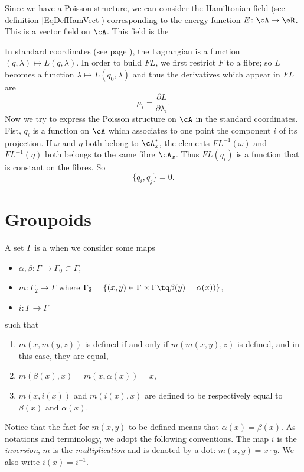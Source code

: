 Since we have a Poisson structure, we can consider the Hamiltonian field (see definition \eqref{EqDefHamVect}) corresponding to the energy function $E\colon \cA\to \eR$. This is a vector field on $\cA$. This field is the 

In standard coordinates (see page \pageref{PgStandCoord}), the Lagrangian is a function $(q,\lambda)\mapsto L(q,\lambda)$. In order to build $FL$, we first restrict $F$ to a fibre; so $L$ becomes a function $\lambda\mapsto L(q_{0},\lambda)$ and thus the derivatives which appear in $FL$ are
\[
	\mu_{i}=\frac{ \partial L }{ \partial\lambda_{i} }.
\]
Now we try to express the Poisson structure on $\cA$ in the standard coordinates. Fist, $q_{i}$ is a  function on $\cA$ which associates to one point the component $i$ of its projection. If $\omega$ and $\eta$ both belong to $\cA^*_{x}$, the elements $FL^{-1}(\omega)$ and $FL^{-1}(\eta)$ both belongs to the same fibre $\cA_{x}$. Thus $FL(q_{i})$ is a function that is constant on the fibres. So
\[
	\{ q_{i},q_{j} \}=0.
\]





%
\section{Groupoids}
%

A set $\Gamma$ is a  when we consider some maps
\begin{itemize}
	\item $\alpha,\beta\colon \Gamma\to \Gamma_{0}\subset\Gamma$,
	\item $m\colon \Gamma_{2}\to \Gamma$ where $\Gamma_{2}=\{ (x,y)\in\Gamma\times\Gamma\tq \beta(y)=\alpha(x)) \}$,
	\item $i\colon \Gamma\to \Gamma$
\end{itemize}
such that
\begin{enumerate}
	\item $m(x,m(y,z))$ is defined if and only if $m(m(x,y),z)$ is defined, and in this case, they are equal,
	\item $m(\beta(x),x)=m(x,\alpha(x))=x$,
	\item $m(x,i(x))$ and $m(i(x),x)$ are defined to be respectively equal to $\beta(x)$ and $\alpha(x)$.
\end{enumerate}
Notice that the fact for $m(x,y)$ to be defined means that $\alpha(x)=\beta(x)$. As notations and terminology, we adopt the following conventions. The map $i$ is the \emph{inversion}, $m$ is the \emph{multiplication} and is denoted by a dot: $m(x,y)=x\cdot y$. We also write $i(x)=i^{-1}$.

